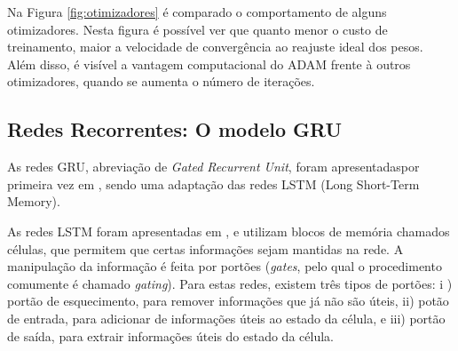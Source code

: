             Na Figura \ref{fig:otimizadores} é comparado  o comportamento de alguns otimizadores. Nesta figura é possível ver que quanto menor o custo de treinamento, maior a velocidade de convergência ao reajuste ideal dos pesos. Além disso, é visível a vantagem computacional do ADAM frente à outros otimizadores, quando se aumenta o número de iterações.
            
            \begin{figure}[ht]
        
            \end{figure}
            
    \subsection{Redes Recorrentes: O modelo GRU}\label{sec:GRU}

    As redes GRU, abreviação de \textit{Gated Recurrent Unit}, foram apresentadaspor primeira vez em \cite{gru}, sendo uma adaptação das redes LSTM (Long Short-Term Memory).
    
    As redes LSTM foram apresentadas em \cite{lstm}, e utilizam blocos de memória chamados células, que permitem que certas informações sejam mantidas na rede. A manipulação da informação é feita por portões (\textit{gates}, pelo qual o procedimento comumente é chamado \textit{gating}). Para estas redes, existem  três tipos de portões: i ) portão de esquecimento, para remover informações que já não são úteis, ii) potão de entrada, para adicionar de informações úteis ao estado da célula, e iii) portão de saída, para extrair informações úteis do estado da célula. 
    
